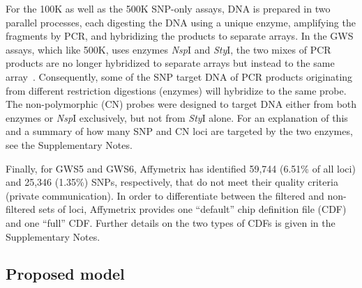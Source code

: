 \documentclass{bioinfo}
\newcommand{\GWSFive}{GWS5\xspace}
\newcommand{\GWSSix}{GWS6\xspace}
\newcommand{\NspI}{\emph{Nsp}I\xspace}
\newcommand{\StyI}{\emph{Sty}I\xspace}
\begin{document}
For the 100K as well as the 500K SNP-only assays, DNA is prepared in two parallel processes, each digesting the DNA using a unique enzyme, amplifying the fragments by PCR, and hybridizing the products to separate arrays.  In the GWS assays, which like 500K, uses enzymes \NspI and \StyI, the two mixes of PCR products are no longer hybridized to separate arrays but instead to the same array~\citep{Affymetrix_2007f, Affymetrix_2007g}.
Consequently, some of the SNP target DNA of PCR products originating from different restriction digestions (enzymes) will hybridize to the same probe.  
The non-polymorphic (CN) probes were designed to target DNA either from both enzymes or \NspI exclusively, but not from \StyI alone.  
For an explanation of this and a summary of how many SNP and CN loci are targeted by the two enzymes, see the Supplementary Notes.


Finally, for \GWSFive and \GWSSix, Affymetrix has identified 59,744 (6.51\% of all loci) and 25,346 (1.35\%) SNPs, respectively, that do not meet their quality criteria (private communication).
In order to differentiate between the filtered and non-filtered sets of loci, Affymetrix provides one ``default'' chip definition file (CDF) and one ``full'' CDF.  Further details on the two types of CDFs is given in the Supplementary Notes.






\subsection{Proposed model}
\end{document}
